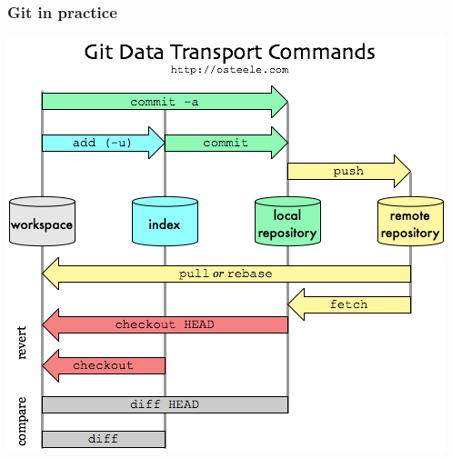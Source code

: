 \documentclass[svgnames]{beamer}
\begin{document}
\begin{frame}
\frametitle{Git in practice}
\centering
\includegraphics[scale=0.45]{img/MgaV9.png}
\end{frame}
\end{document}
